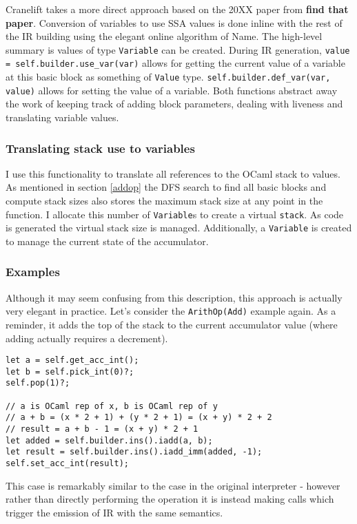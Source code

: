 Cranelift takes a more direct approach based on the 20XX paper from \textbf{find that paper}.
Conversion of variables to use SSA values is done inline with the rest of the IR building using the
elegant online algorithm of Name. The high-level summary is values of type \texttt{Variable} can be
created. During IR generation, \texttt{value = self.builder.use\_var(var)} allows for getting the
current value of a variable at this basic block as something of \texttt{Value} type.
\texttt{self.builder.def\_var(var, value)} allows for setting the value of a variable. Both
functions abstract away the work of keeping track of adding block parameters, dealing with liveness
and translating variable values.

\subsubsection{Translating stack use to variables}

I use this functionality to translate all references to the OCaml stack to values. As mentioned in
section \ref{addop} the DFS search to find all basic blocks and compute stack sizes also stores the
maximum stack size at any point in the function. I allocate this number of \texttt{Variable}s to
create a virtual \texttt{stack}. As code is generated the virtual stack size is managed.
Additionally, a \texttt{Variable} is created to manage the current state of the accumulator.

\subsubsection{Examples}

Although it may seem confusing from this description, this approach is actually very elegant in
practice. Let's consider the \texttt{ArithOp(Add)} example again. As a reminder, it adds the top of
the stack to the current accumulator value (where adding actually requires a decrement).

\begin{verbatim}
let a = self.get_acc_int();
let b = self.pick_int(0)?;
self.pop(1)?;

// a is OCaml rep of x, b is OCaml rep of y
// a + b = (x * 2 + 1) + (y * 2 + 1) = (x + y) * 2 + 2
// result = a + b - 1 = (x + y) * 2 + 1
let added = self.builder.ins().iadd(a, b);
let result = self.builder.ins().iadd_imm(added, -1);
self.set_acc_int(result);
\end{verbatim}

This case is remarkably similar to the case in the original interpreter - however rather than
directly performing the operation it is instead making calls which trigger the emission of IR with
the same semantics.


